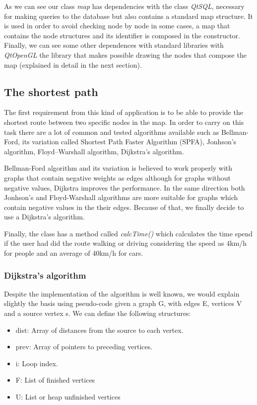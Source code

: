 \documentclass{article}
\begin{document}
As we can see our class \textit{map} has dependencies with the class \textit{QtSQL}, necessary for making queries to the database but also contains a standard map structure. It is used in order to avoid checking node by node in some cases, a map that contains the node structures and its identifier is composed in the constructor. Finally, we can see some other dependences with standard libraries with \textit{QtOpenGL} the library that makes possible drawing the nodes that compose the map (explained in detail in the next section).

\subsection{The shortest path}
The first requirement from this kind of application is to be able to provide the shortest route between two specific nodes in the map. In order to carry on this task there are a lot of common and tested algorithms available such as Bellman-Ford, its variation called  Shortest Path Faster Algorithm (SPFA), Jonhson's algorithm, Floyd–Warshall algorithm, Dijkstra's algorithm.

Bellman-Ford algorithm and its variation is believed to work properly with graphs that contain negative weights as edges although for graphs without negative values, Dijkstra improves the performance. In the same direction both Jonhson's and Floyd-Warshall algorithms are more suitable for graphs which contain negative values in the their edges. Because of that, we finally decide to use a Dijkstra's algorithm.

Finally, the class has a method called \textit{calcTime()} which calculates the time spend if the user had did the route walking or driving considering the speed as 4km/h for people and an average of 40km/h for cars.

\subsubsection{Dijkstra's algorithm}
Despite the implementation of the algorithm is well known, we would explain slightly the basis using pseudo-code given a graph G, with edges E, vertices V and a source vertex s. We can define the following structures:

\begin{itemize}
  \item dist: Array of distances from the source to each vertex.
  \item prev: Array of pointers to preceding vertices.
  \item i: Loop index.
  \item F: List of finished vertices
  \item U: List or heap unfinished vertices
\end{itemize}
\end{document}
